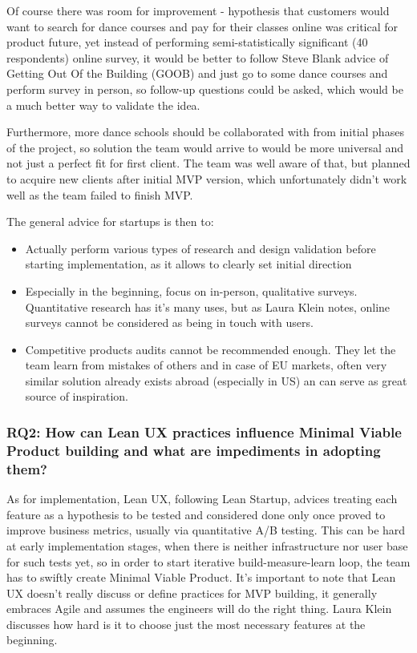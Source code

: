 \documentclass{article}
\begin{document}
Of course there was room for improvement - hypothesis that customers would want to search for dance courses and pay for their classes online was critical for product future, yet instead of performing semi-statistically significant (40 respondents) online survey, it would be better to follow Steve Blank \cite{blank2013four} advice of Getting Out Of the Building (GOOB) and just go to some dance courses and perform survey in person, so follow-up questions could be asked, which would be a much better way to validate the idea.

Furthermore, more dance schools should be collaborated with from initial phases of the project, so solution the team would arrive to would be more universal and not just a perfect fit for first client. The team was well aware of that, but planned to acquire new clients after initial MVP version, which unfortunately didn't work well as the team failed to finish MVP.

The general advice for startups is then to:
\begin{itemize}
\item Actually perform various types of research and design validation before starting implementation, as it allows to clearly set initial direction
\item Especially in the beginning, focus on in-person, qualitative surveys. Quantitative research has it's many uses, but as Laura Klein \cite{klein2013ux} notes, online surveys cannot be considered as being in touch with users.
\item Competitive products audits cannot be recommended enough. They let the team learn from mistakes of others and in case of EU markets, often very similar solution already exists abroad (especially in US) an can serve as great source of inspiration.
\end{itemize}

\subsubsection{RQ2: How can Lean UX practices influence Minimal Viable Product building and what are impediments in adopting them?}
As for implementation, Lean UX, following Lean Startup, advices treating each feature as a hypothesis to be tested and considered done only once proved to improve business metrics, usually via quantitative A/B testing. This can be hard at early implementation stages, when there is neither infrastructure nor user base for such tests yet, so in order to start iterative build-measure-learn loop, the team has to swiftly create Minimal Viable Product. It's important to note that Lean UX doesn't really discuss or define practices for MVP building, it generally embraces Agile and assumes the engineers will do the right thing. Laura Klein \cite{klein2013ux} discusses how hard is it to choose just the most necessary features at the beginning.
\end{document}
